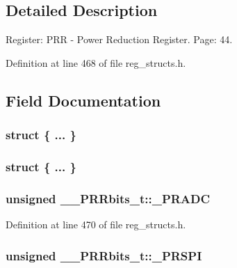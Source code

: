 \subsection{Detailed Description}
Register\+: P\+R\+R -\/ Power Reduction Register. Page\+: 44. 

Definition at line 468 of file reg\+\_\+structs.\+h.



\subsection{Field Documentation}
\hypertarget{union_____p_r_rbits__t_a28217f89f00179132a4d53da2a0f4263}{\subsubsection[{"@113}]{\setlength{\rightskip}{0pt plus 5cm}struct \{ ... \} }}\label{union_____p_r_rbits__t_a28217f89f00179132a4d53da2a0f4263}
\hypertarget{union_____p_r_rbits__t_aa42a0fdc1be1e581c3f4b931f8a8e1d2}{\subsubsection[{"@115}]{\setlength{\rightskip}{0pt plus 5cm}struct \{ ... \} }}\label{union_____p_r_rbits__t_aa42a0fdc1be1e581c3f4b931f8a8e1d2}
\hypertarget{union_____p_r_rbits__t_a3b82644cf3f24a1a18fbbaf8823817e6}{
\subsubsection[{\+\_\+\+P\+R\+A\+D\+C}]{\setlength{\rightskip}{0pt plus 5cm}unsigned \+\_\+\+\_\+\+P\+R\+Rbits\+\_\+t\+::\+\_\+\+P\+R\+A\+D\+C}}\label{union_____p_r_rbits__t_a3b82644cf3f24a1a18fbbaf8823817e6}


Definition at line 470 of file reg\+\_\+structs.\+h.

\hypertarget{union_____p_r_rbits__t_a66326bc6af2d4e834db931f489592c57}{
\subsubsection[{\+\_\+\+P\+R\+S\+P\+I}]{\setlength{\rightskip}{0pt plus 5cm}unsigned \+\_\+\+\_\+\+P\+R\+Rbits\+\_\+t\+::\+\_\+\+P\+R\+S\+P\+I}}\label{union_____p_r_rbits__t_a66326bc6af2d4e834db931f489592c57}


